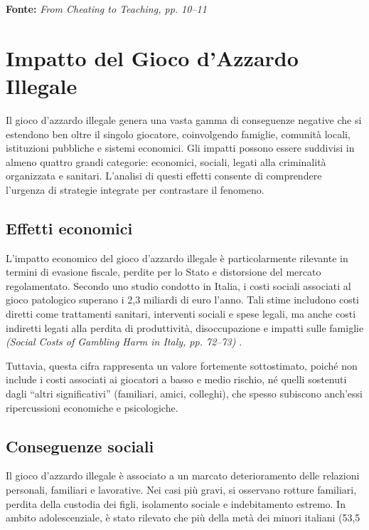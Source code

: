 \documentclass[a4paper,12pt]{article}
\begin{document}
\textbf{Fonte:} \textit{From Cheating to Teaching, pp. 10--11} \cite{bento2010cheating}




\section{Impatto del Gioco d'Azzardo Illegale}

Il gioco d’azzardo illegale genera una vasta gamma di conseguenze negative che si estendono ben oltre il singolo giocatore, coinvolgendo famiglie, comunità locali, istituzioni pubbliche e sistemi economici. Gli impatti possono essere suddivisi in almeno quattro grandi categorie: economici, sociali, legati alla criminalità organizzata e sanitari. L’analisi di questi effetti consente di comprendere l’urgenza di strategie integrate per contrastare il fenomeno.

\subsection{Effetti economici}

L’impatto economico del gioco d’azzardo illegale è particolarmente rilevante in termini di evasione fiscale, perdite per lo Stato e distorsione del mercato regolamentato. Secondo uno studio condotto in Italia, i costi sociali associati al gioco patologico superano i 2,3 miliardi di euro l’anno. Tali stime includono costi diretti come trattamenti sanitari, interventi sociali e spese legali, ma anche costi indiretti legati alla perdita di produttività, disoccupazione e impatti sulle famiglie \textit{(Social Costs of Gambling Harm in Italy, pp. 72--73)} \cite{lucchini2022socialcosts}.

Tuttavia, questa cifra rappresenta un valore fortemente sottostimato, poiché non include i costi associati ai giocatori a basso e medio rischio, né quelli sostenuti dagli “altri significativi” (familiari, amici, colleghi), che spesso subiscono anch’essi ripercussioni economiche e psicologiche.

\subsection{Conseguenze sociali}

Il gioco d’azzardo illegale è associato a un marcato deterioramento delle relazioni personali, familiari e lavorative. Nei casi più gravi, si osservano rotture familiari, perdita della custodia dei figli, isolamento sociale e indebitamento estremo. In ambito adolescenziale, è stato rilevato che più della metà dei minori italiani (53,5%
\end{document}
